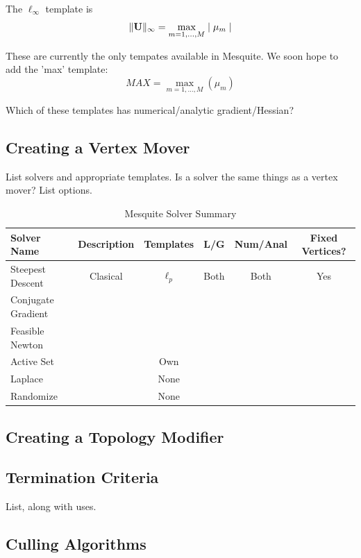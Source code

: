 \documentclass[psfig]{article}
\begin{document}
 \newline
The $\ell_{\infty}$ template is
\begin{equation}
\| {\bf U} \|_{\infty} = \max_{m=1,\ldots,M} \mid \mu_m \mid
\end{equation}

These are currently the only tempates available in Mesquite.
We soon hope to add the 'max' template:
\begin{equation}
MAX = \max_{m=1,\ldots,M} ( \mu_m )
\end{equation}

Which of these templates has numerical/analytic gradient/Hessian?

\subsection{Creating a Vertex Mover}
List solvers and appropriate templates. Is a solver the same things as a 
vertex mover? List options.

\begin{table}[h]
\begin{center}
\begin{tabular}{|l|c|c|c|c|c|}
\hline
Solver Name & Description & Templates & L/G & Num/Anal & Fixed Vertices? \\ \hline
Steepest Descent & Clasical & $\ell_p$ & Both & Both & Yes \\
Conjugate Gradient & & & & & \\
Feasible Newton & & & & & \\
Active Set & & Own & & & \\
Laplace & & None & & & \\
Randomize & & None & & & \\
\hline
\end{tabular}
\caption{\label{Solvers} Mesquite Solver Summary}
\end{center}
\end{table}


\subsection{Creating a Topology Modifier}

\subsection{Termination Criteria}
List, along with uses.

\subsection{Culling Algorithms}
\end{document}
